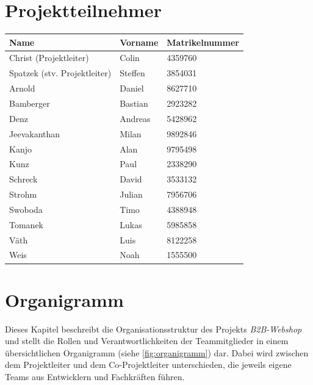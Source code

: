 \documentclass[%
	ngerman,
	12pt,
	a4paper,
	oneside,
	parskip=full
]{scrbook}
\begin{document}
\section{Projektteilnehmer}
\begin{tabular}{l|l|l}
	\textbf{Name}                & \textbf{Vorname} & \textbf{Matrikelnummer} \\ \hline
	Christ (Projektleiter)       & Colin            & 4359760                 \\
	Spatzek (stv. Projektleiter) & Steffen          & 3854031                 \\ \hline
	Arnold                       & Daniel           & 8627710                 \\
	Bamberger                    & Bastian          & 2923282                 \\
	Denz                         & Andreas          & 5428962                 \\
	Jeevakanthan                 & Milan            & 9892846                 \\
	Kanjo                        & Alan             & 9795498                 \\
	Kunz                         & Paul             & 2338290                 \\
	Schreck                      & David            & 3533132                 \\
	Strohm                       & Julian           & 7956706                 \\
	Swoboda                      & Timo             & 4388948                 \\
	Tomanek                      & Lukas            & 5985858                 \\
	Väth                         & Luis             & 8122258                 \\
	Weis                         & Noah             & 1555500
\end{tabular}

\section{Organigramm}
Dieses Kapitel beschreibt die Organisationsstruktur des Projekts \textit{B2B-Webshop} und stellt die Rollen und Verantwortlichkeiten der Teammitglieder in einem übersichtlichen Organigramm (siehe \cref{fig:organigramm}) dar.
Dabei wird zwischen dem Projektleiter und dem Co-Projektleiter unterschieden, die jeweils eigene Teams aus Entwicklern und Fachkräften führen.
\end{document}
